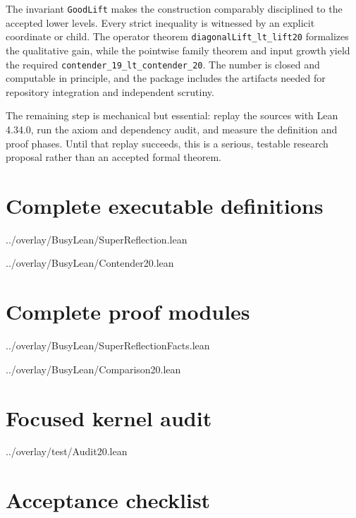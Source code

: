\documentclass[11pt]{article}
\theoremstyle{definition}
\theoremstyle{remark}
\newcommand{\leanname}[1]{\nolinkurl{#1}}
\begin{document}
The invariant \leanname{GoodLift} makes the construction comparably disciplined
to the accepted lower levels.  Every strict inequality is witnessed by an
explicit coordinate or child.  The operator theorem
\leanname{diagonalLift_lt_lift20} formalizes the qualitative gain, while the
pointwise family theorem and input growth yield the required
\leanname{contender_19_lt_contender_20}.  The number is closed and computable in
principle, and the package includes the artifacts needed for repository
integration and independent scrutiny.

The remaining step is mechanical but essential: replay the sources with Lean
4.34.0, run the axiom and dependency audit, and measure the definition and proof
phases.  Until that replay succeeds, this is a serious, testable research
proposal rather than an accepted formal theorem.

\appendix
\section{Complete executable definitions}


  {../overlay/BusyLean/SuperReflection.lean}


  {../overlay/BusyLean/Contender20.lean}

\section{Complete proof modules}


  {../overlay/BusyLean/SuperReflectionFacts.lean}


  {../overlay/BusyLean/Comparison20.lean}

\section{Focused kernel audit}


  {../overlay/test/Audit20.lean}

\section{Acceptance checklist}
\end{document}
